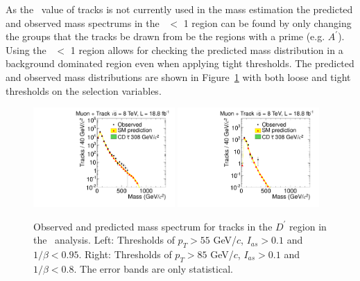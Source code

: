 As the \invbeta\ value of tracks is not currently used in the mass estimation the predicted and observed mass spectrums in the \invbeta\ $<$ 1 region can be
found by only changing the groups that the tracks be drawn from be the regions with a prime (e.g. $A^\prime$). Using the \invbeta\ $<$ 1 region allows for checking
the predicted mass distribution in a background dominated region even when applying tight thresholds. The predicted and observed mass distributions are shown in 
Figure~\ref{fig:FlipMassDistribution} with both loose and tight thresholds on the selection variables.

\begin{figure}
 \begin{center}
  \includegraphics[clip=false, trim=0.0cm 0cm 0.0cm 0cm, width=0.48\textwidth]{figures/tkmu/RescaleNoRatio_Mass_Flip_8TeV_LooseNoSMMC}
  \includegraphics[clip=false, trim=0.0cm 0cm 0.0cm 0cm, width=0.48\textwidth]{figures/tkmu/RescaleNoRatio_Mass_Flip_8TeV_TightNoSMMC}
 \end{center}
 \caption[Observed and predicted mass spectrum for tracks in the \invbeta\ $<$ 1 region in the \tktof\ analysis.]
{Observed and predicted mass spectrum for tracks in the $D^\prime$ region in the \tktof\ analysis.
Left: Thresholds of $p_T > 55$ GeV/$c$, $I_{as} > 0.1$ and $1/\beta < 0.95$.
Right: Thresholds of $p_T > 85$ GeV/$c$, $I_{as} > 0.1$ and $1/\beta < 0.8$.
The error bands are only statistical.}
\label{fig:FlipMassDistribution}
\end{figure}

